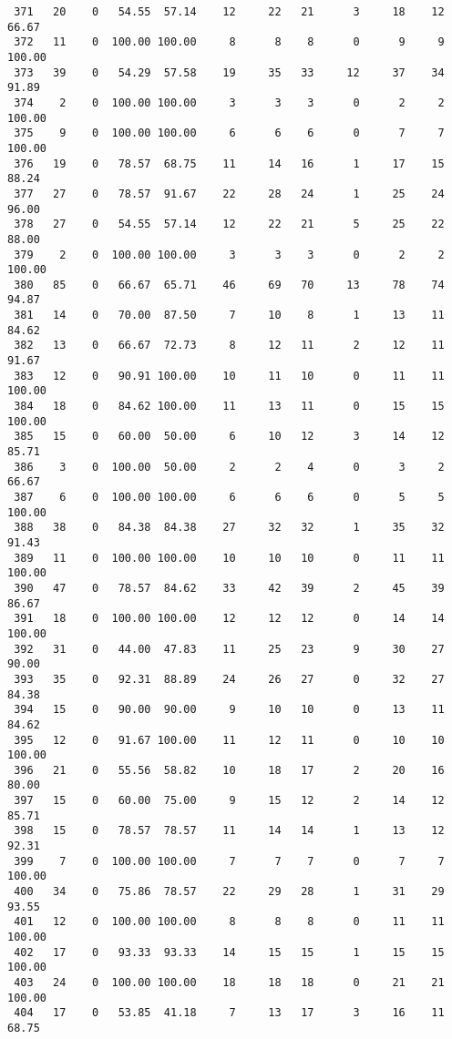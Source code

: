 \begin{verbatim}
 371   20    0   54.55  57.14    12     22   21      3     18    12    66.67
 372   11    0  100.00 100.00     8      8    8      0      9     9   100.00
 373   39    0   54.29  57.58    19     35   33     12     37    34    91.89
 374    2    0  100.00 100.00     3      3    3      0      2     2   100.00
 375    9    0  100.00 100.00     6      6    6      0      7     7   100.00
 376   19    0   78.57  68.75    11     14   16      1     17    15    88.24
 377   27    0   78.57  91.67    22     28   24      1     25    24    96.00
 378   27    0   54.55  57.14    12     22   21      5     25    22    88.00
 379    2    0  100.00 100.00     3      3    3      0      2     2   100.00
 380   85    0   66.67  65.71    46     69   70     13     78    74    94.87
 381   14    0   70.00  87.50     7     10    8      1     13    11    84.62
 382   13    0   66.67  72.73     8     12   11      2     12    11    91.67
 383   12    0   90.91 100.00    10     11   10      0     11    11   100.00
 384   18    0   84.62 100.00    11     13   11      0     15    15   100.00
 385   15    0   60.00  50.00     6     10   12      3     14    12    85.71
 386    3    0  100.00  50.00     2      2    4      0      3     2    66.67
 387    6    0  100.00 100.00     6      6    6      0      5     5   100.00
 388   38    0   84.38  84.38    27     32   32      1     35    32    91.43
 389   11    0  100.00 100.00    10     10   10      0     11    11   100.00
 390   47    0   78.57  84.62    33     42   39      2     45    39    86.67
 391   18    0  100.00 100.00    12     12   12      0     14    14   100.00
 392   31    0   44.00  47.83    11     25   23      9     30    27    90.00
 393   35    0   92.31  88.89    24     26   27      0     32    27    84.38
 394   15    0   90.00  90.00     9     10   10      0     13    11    84.62
 395   12    0   91.67 100.00    11     12   11      0     10    10   100.00
 396   21    0   55.56  58.82    10     18   17      2     20    16    80.00
 397   15    0   60.00  75.00     9     15   12      2     14    12    85.71
 398   15    0   78.57  78.57    11     14   14      1     13    12    92.31
 399    7    0  100.00 100.00     7      7    7      0      7     7   100.00
 400   34    0   75.86  78.57    22     29   28      1     31    29    93.55
 401   12    0  100.00 100.00     8      8    8      0     11    11   100.00
 402   17    0   93.33  93.33    14     15   15      1     15    15   100.00
 403   24    0  100.00 100.00    18     18   18      0     21    21   100.00
 404   17    0   53.85  41.18     7     13   17      3     16    11    68.75

\end{verbatim}
